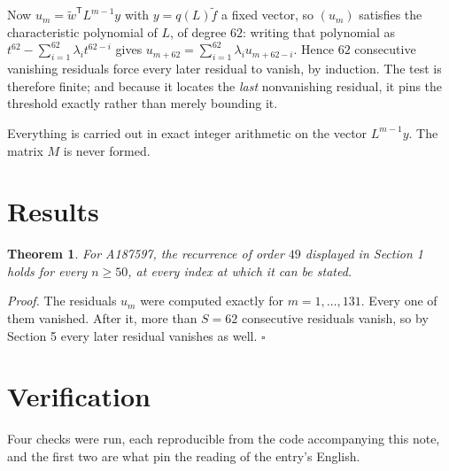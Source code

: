 \documentclass[11pt]{article}
\newtheorem{theorem}{Theorem}
\theoremstyle{definition}
\begin{document}
Now $u_m = \tilde w^{\mathsf T} L^{m-1} y$ with $y = q(L)\tilde f$ a fixed vector, so $(u_m)$ satisfies the characteristic polynomial of $L$, of degree $62$: writing that polynomial as $t^{62} - \sum_{i=1}^{62} \lambda_i t^{62-i}$ gives $u_{m+62} = \sum_{i=1}^{62} \lambda_i u_{m+62-i}$. Hence $62$ consecutive vanishing residuals force every later residual to vanish, by induction. The test is therefore finite; and because it locates the {\itshape last} nonvanishing residual, it pins the threshold exactly rather than merely bounding it.

Everything is carried out in exact integer arithmetic on the vector $L^{m-1}y$. The matrix $M$ is never formed.

\section{Results}

\begin{theorem} For A187597, the recurrence of order $49$ displayed in Section 1 holds for every $n \ge 50$, at every index at which it can be stated.\end{theorem}

{\itshape Proof.} The residuals $u_m$ were computed exactly for $m = 1,\dots,131$. Every one of them vanished. After it, more than $S = 62$ consecutive residuals vanish, so by Section 5 every later residual vanishes as well. $\square$

\section{Verification}

Four checks were run, each reproducible from the code accompanying this note, and the first two are what pin the reading of the entry's English.
\end{document}
